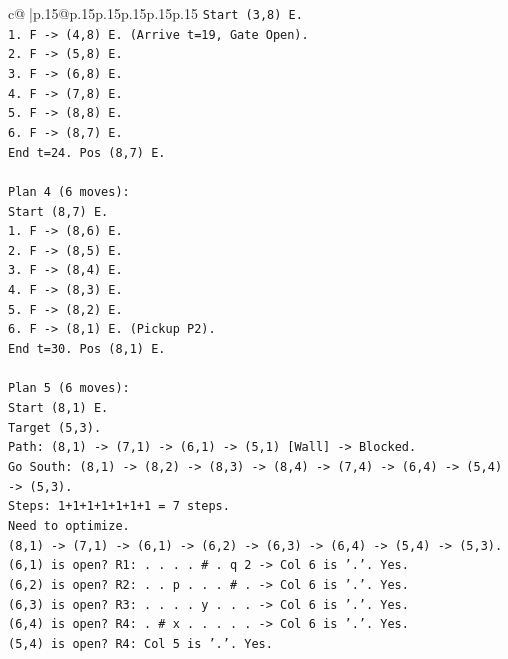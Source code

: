 \documentclass{article}
\begin{document}
{\begin{supertabular}{c@{$\;$}|p{.15\linewidth}@{}p{.15\linewidth}p{.15\linewidth}p{.15\linewidth}p{.15\linewidth}p{.15\linewidth}}
{{{\texttt{Start (3,8) E.} \\
\texttt{1. F {-}> (4,8) E. (Arrive t=19, Gate Open).} \\
\texttt{2. F {-}> (5,8) E.} \\
\texttt{3. F {-}> (6,8) E.} \\
\texttt{4. F {-}> (7,8) E.} \\
\texttt{5. F {-}> (8,8) E.} \\
\texttt{6. F {-}> (8,7) E.} \\
\texttt{End t=24. Pos (8,7) E.} \\
\\ 
\texttt{Plan 4 (6 moves):} \\
\texttt{Start (8,7) E.} \\
\texttt{1. F {-}> (8,6) E.} \\
\texttt{2. F {-}> (8,5) E.} \\
\texttt{3. F {-}> (8,4) E.} \\
\texttt{4. F {-}> (8,3) E.} \\
\texttt{5. F {-}> (8,2) E.} \\
\texttt{6. F {-}> (8,1) E. (Pickup P2).} \\
\texttt{End t=30. Pos (8,1) E.} \\
\\ 
\texttt{Plan 5 (6 moves):} \\
\texttt{Start (8,1) E.} \\
\texttt{Target (5,3).} \\
\texttt{Path: (8,1) {-}> (7,1) {-}> (6,1) {-}> (5,1) {[}Wall{]} {-}> Blocked.} \\
\texttt{Go South: (8,1) {-}> (8,2) {-}> (8,3) {-}> (8,4) {-}> (7,4) {-}> (6,4) {-}> (5,4) {-}> (5,3).} \\
\texttt{Steps: 1+1+1+1+1+1+1 = 7 steps.} \\
\texttt{Need to optimize.} \\
\texttt{(8,1) {-}> (7,1) {-}> (6,1) {-}> (6,2) {-}> (6,3) {-}> (6,4) {-}> (5,4) {-}> (5,3).} \\
\texttt{(6,1) is open? R1: . . . . \# . q 2 {-}> Col 6 is '.'. Yes.} \\
\texttt{(6,2) is open? R2: . . p . . . \# . {-}> Col 6 is '.'. Yes.} \\
\texttt{(6,3) is open? R3: . . . . y . . . {-}> Col 6 is '.'. Yes.} \\
\texttt{(6,4) is open? R4: . \# x . . . . . {-}> Col 6 is '.'. Yes.} \\
\texttt{(5,4) is open? R4: Col 5 is '.'. Yes.} \\
}}}
\end{supertabular}}
\end{document}
